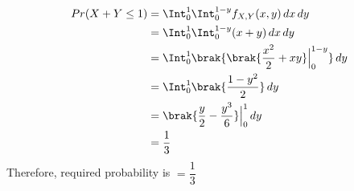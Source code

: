 
\begin{align}
Pr(X+Y\leq 1)&=\Int_{0}^{1} \Int_{0}^{1-y}f_{X,Y}(x,y) \,dx\,dy
\\
&=\Int_{0}^{1} \Int_{0}^{1-y}(x+y)\,dx\,dy
\\
&=\Int_{0}^{1} \brak{\brak{\dfrac{x^2}{2}+xy} \Big|_{0}^{1-y}}\,dy
\\
&=\Int_{0}^{1} \brak{\dfrac{1-y^2}{2} }\,dy
\\
&= \brak{\dfrac{y}{2}-\dfrac{y^3}{6}}\Big|_{0}^{1}\,dy
\\
&=\dfrac{1}{3}
\end{align}
Therefore, required probability is $=\dfrac{1}{3}$